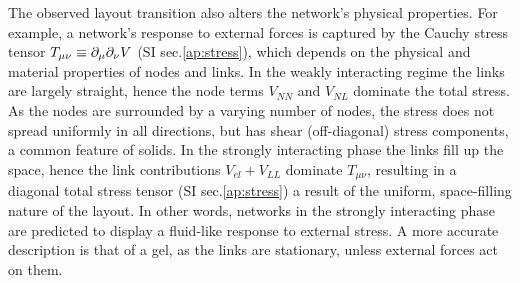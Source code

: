 \documentclass[nofootinbib,preprint,floatfix,titlepage,superscriptaddress]{revtex4} %
\newcommand{\outNim}[1]{}
\begin{document}
The observed layout transition also alters the  network's physical properties.
For example, a network's response to external forces is captured by the Cauchy stress tensor $T_{\mu\nu} \equiv \partial_\mu\partial_\nu V$ \cite{irgens2008continuum} (SI sec.\ref{ap:stress}), which depends on the physical and material properties of nodes and links. 
In the weakly interacting regime the links are largely straight, hence the node terms $V_{NN}$ and $V_{NL}$ dominate the total stress. 
As the nodes are surrounded by a varying number of nodes, the stress does not spread uniformly in all directions, but has shear (off-diagonal) stress components, a common feature of solids.
In the strongly interacting phase the links fill up the space,
hence the link contributions $V_{el}+V_{LL}$  dominate $T_{\mu\nu}$, 
resulting in a diagonal total stress tensor (SI sec.\ref{ap:stress}) a result of the uniform, space-filling nature of the layout. 
\outNim{
in the strongly interacting phase
\begin{equation}
    T_{\mu\nu} \approx %
    f(k,A_L,\be{l})\delta_{\mu\nu} \label{eq:Tstrong}
,\end{equation}
%
describing a hydrodynamic stress with pressure $p = f(k,A_L,\be{l})$ %
} %
In other words, networks in the strongly interacting phase are predicted to display a fluid-like response to external stress. 
A more accurate description is that of a gel, %
as the links are stationary, unless external forces act on them. 
\end{document}
